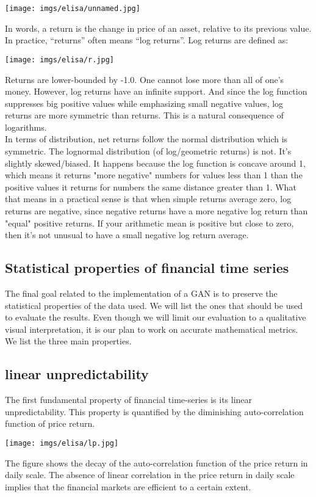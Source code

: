 \documentclass{article}
\begin{document}
    \begin{center}
        \texttt{[image: imgs/elisa/unnamed.jpg]} 
    \end{center}
    In words, a return is the change in price of an asset, relative to its previous value. In practice, “returns” often means “log returns”. Log returns are defined as:
    \begin{center}
        \texttt{[image: imgs/elisa/r.jpg]} 
    \end{center}
    Returns are lower-bounded by -1.0. One cannot lose more than all of one's money. However, log returns have an infinite support. And since the log function suppresses big positive values while emphasizing small negative values, log returns are more symmetric than returns. This is a natural consequence of logarithms.\\
    In terms of distribution, net returns follow the normal distribution which is symmetric. The lognormal distribution (of log/geometric returns) is not. It's slightly skewed/biased. It happens because the log function is concave around 1, which means it returns "more negative" numbers for values less than 1 than the positive values it returns for numbers the same distance greater than 1. What that means in a practical sense is that when simple returns average zero, log returns are negative, since negative returns have a more negative log return than "equal" positive returns. If your arithmetic mean is positive but close to zero, then it's not unusual to have a small negative log return average. 
    
    \subsection*{Statistical properties of financial time series}
    The final goal related to the implementation of a GAN is to preserve the statistical properties of the data used. We will list the ones that should be used to evaluate the results. Even though we will limit our evaluation to a qualitative visual interpretation, it is our plan to work on accurate mathematical metrics. We list the three main properties. \\
    \subsection*{linear unpredictability}
    The first fundamental property of financial time-series is its linear unpredictability. This property is quantified by the diminishing auto-correlation function of price return. \\
     \begin{center}
        \texttt{[image: imgs/elisa/lp.jpg]} 
    \end{center}
    The figure shows the decay of the auto-correlation function of the price return in daily scale. The absence of linear correlation in the price return in daily scale implies that the financial markets are efficient to a certain extent.\\
\end{document}

